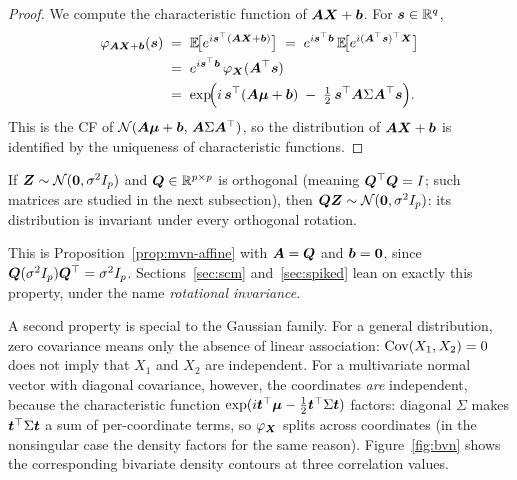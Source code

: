 \begin{proof}
We compute the characteristic function of \(\bm{A} \bm{X} + \bm{b}\). For \(\bm{s} \in \mathbb{R}^q\),
\begin{align*}
  \varphi_{\bm{A} \bm{X} + \bm{b}}(\bm{s})
  &\;=\; \mathbb{E}\!\bigl[e^{i \bm{s}^{\top} (\bm{A} \bm{X} + \bm{b})}\bigr]
  \;=\; e^{i \bm{s}^{\top} \bm{b}}\, \mathbb{E}\!\bigl[e^{i (\bm{A}^{\top} \bm{s})^{\top} \bm{X}}\bigr] \\
  &\;=\; e^{i \bm{s}^{\top} \bm{b}}\, \varphi_{\bm{X}}(\bm{A}^{\top} \bm{s}) \\
  &\;=\; \exp\!\Bigl(i\, \bm{s}^{\top}(\bm{A} \bm{\mu} + \bm{b}) \;-\; \tfrac{1}{2}\, \bm{s}^{\top} \bm{A} \Sigma \bm{A}^{\top} \bm{s}\Bigr).
\end{align*}
This is the CF of \(\mathcal{N}(\bm{A} \bm{\mu} + \bm{b},\, \bm{A} \Sigma \bm{A}^{\top})\), so the distribution of \(\bm{A} \bm{X} + \bm{b}\) is identified by the uniqueness of characteristic functions.
\end{proof}

\begin{corollary}\label{cor:gaussian-rotation}
If \(\bm{Z} \sim \mathcal{N}(\bm{0}, \sigma^2 I_p)\) and \(\bm{Q} \in \mathbb{R}^{p \times p}\) is orthogonal (meaning \(\bm{Q}^{\top} \bm{Q} = I\); such matrices are studied in the next subsection), then \(\bm{Q} \bm{Z} \sim \mathcal{N}(\bm{0}, \sigma^2 I_p)\): its distribution is invariant under every orthogonal rotation.
\end{corollary}

This is Proposition~\ref{prop:mvn-affine} with \(\bm{A} = \bm{Q}\) and \(\bm{b} = \bm{0}\), since \(\bm{Q} (\sigma^2 I_p) \bm{Q}^{\top} = \sigma^2 I_p\). Sections~\ref{sec:scm} and~\ref{sec:spiked} lean on exactly this property, under the name \emph{rotational invariance}.

A second property is special to the Gaussian family. For a general distribution, zero covariance means only the absence of linear association: \(\operatorname{Cov}(X_1, X_2) = 0\) does not imply that \(X_1\) and \(X_2\) are independent. For a multivariate normal vector with diagonal covariance, however, the coordinates \emph{are} independent, because the characteristic function \(\exp(i\bm{t}^{\top}\bm{\mu}-\tfrac12\bm{t}^{\top}\Sigma\bm{t})\) factors: diagonal \(\Sigma\) makes \(\bm{t}^{\top}\Sigma\bm{t}\) a sum of per-coordinate terms, so \(\varphi_{\bm{X}}\) splits across coordinates (in the nonsingular case the density factors for the same reason). Figure~\ref{fig:bvn} shows the corresponding bivariate density contours at three correlation values.

